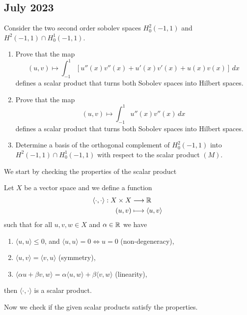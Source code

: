 \subsection{July 2023}
\begin{exercise}
    Consider the two second order sobolev spaces \(H^2_0(-1, 1)\) and \(H^2(-1, 1) \cap H^1_0(-1, 1)\). 
    \begin{enumerate}
        \item Prove that the map 
        \[
            (u, v) \longmapsto \int_{-1}^1 \left[ u''(x) v''(x) + u'(x) v'(x) + u(x) v(x) \right] \, dx
        \]
        defines a scalar product that turns both Sobolev spaces into Hilbert spaces.
        \item Prove that the map
        \[
            (u, v) \longmapsto \int_{-1}^1 u''(x) v''(x) \, dx
            \tag{(M)}
        \]
        defines a scalar product that turns both Sobolev spaces into Hilbert spaces.
        \item Determine a basis of the orthogonal complement of \(H^2_0(-1, 1)\) into \(H^2(-1, 1)\cap H^1_0(-1, 1)\) with respect to the scalar product \((M)\).
    \end{enumerate}
\end{exercise}
We start by checking the properties of the scalar product
\begin{remark}
    Let \(X\) be a vector space and we define a function
    \[
        \begin{aligned}
            \langle \cdot, \cdot \rangle : X \times X &\longrightarrow \mathbb{R} \\
            (u, v) &\longmapsto \langle u, v \rangle
        \end{aligned}
    \]
    such that for all \(u, v, w \in X\) and \(\alpha \in \mathbb{R}\) we have
    \begin{enumerate}
        \item \(\langle u, u \rangle \leq 0\), and \(\langle u, u \rangle = 0 \iff u = 0\) (non-degeneracy),
        \item \(\langle u, v \rangle = \langle v, u \rangle\) (symmetry),
        \item \(\langle \alpha u + \beta v, w \rangle = \alpha \langle u, w \rangle + \beta \langle v, w \rangle\) (linearity),
    \end{enumerate}
    then \(\langle \cdot, \cdot \rangle\) is a scalar product. 
\end{remark}
Now we check if the given scalar products satisfy the properties. 

